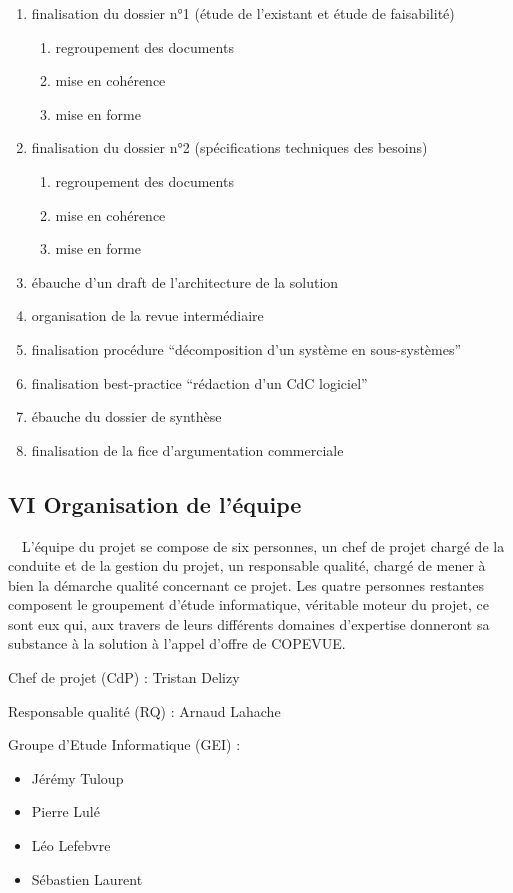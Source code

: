 \documentclass{article}
\begin{document}
\begin{enumerate}
\item finalisation du dossier n°1 (étude de l’existant et étude de
faisabilité)

\begin{enumerate}
\item regroupement des documents
\item mise en cohérence
\item mise en forme
\end{enumerate}
\item finalisation du dossier n°2 (spécifications techniques des
besoins)

\begin{enumerate}
\item regroupement des documents
\item mise en cohérence
\item mise en forme
\end{enumerate}
\item ébauche d’un draft de l’architecture de la solution
\item organisation de la revue intermédiaire
\item finalisation procédure “décomposition d’un système en
sous-systèmes”
\item finalisation best-practice “rédaction d’un CdC logiciel”
\item ébauche du dossier de synthèse
\item finalisation de la fice d’argumentation commerciale
\end{enumerate}
\subsection[VI Organisation de l’équipe]{VI Organisation de l’équipe}
\ \ L’équipe du projet se compose de six personnes, un chef de projet
chargé de la conduite et de la gestion du projet, un responsable
qualité, chargé de mener à bien la démarche qualité concernant ce
projet. Les quatre personnes restantes composent le groupement d’étude
informatique, véritable moteur du projet, ce sont eux qui, aux travers
de leurs différents domaines d’expertise donneront sa substance à la
solution à l’appel d’offre de COPEVUE.

Chef de projet (CdP) : Tristan Delizy

Responsable qualité (RQ) : Arnaud Lahache

Groupe d’Etude Informatique (GEI) :  

\begin{itemize}
\item Jérémy Tuloup
\item Pierre Lulé
\item Léo Lefebvre
\item Sébastien Laurent
\end{itemize}
\end{document}
